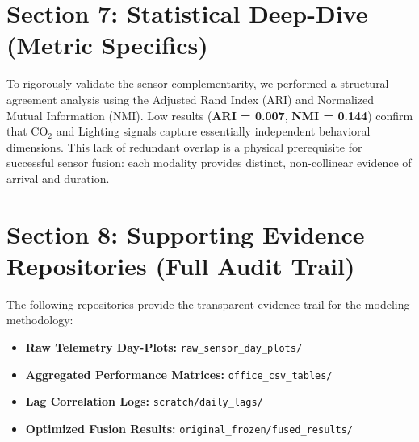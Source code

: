 \documentclass[11pt,a4paper]{article}
\begin{document}
\begin{table}[h]
\centering
\caption{Fusion Schedule Math Excerpt (Office 413, Aug 24)}
\end{table}

\section{Section 7: Statistical Deep-Dive (Metric Specifics)}
To rigorously validate the sensor complementarity, we performed a structural agreement analysis using the Adjusted Rand Index (ARI) and Normalized Mutual Information (NMI). Low results (\textbf{ARI = 0.007}, \textbf{NMI = 0.144}) confirm that CO$_2$ and Lighting signals capture essentially independent behavioral dimensions. This lack of redundant overlap is a physical prerequisite for successful sensor fusion: each modality provides distinct, non-collinear evidence of arrival and duration.

\section{Section 8: Supporting Evidence Repositories (Full Audit Trail)}
The following repositories provide the transparent evidence trail for the modeling methodology:
\begin{itemize}
    \item \textbf{Raw Telemetry Day-Plots:} \texttt{raw\_sensor\_day\_plots/}
    \item \textbf{Aggregated Performance Matrices:} \texttt{office\_csv\_tables/}
    \item \textbf{Lag Correlation Logs:} \texttt{scratch/daily\_lags/}
    \item \textbf{Optimized Fusion Results:} \texttt{original\_frozen/fused\_results/}
\end{itemize}
\end{document}
